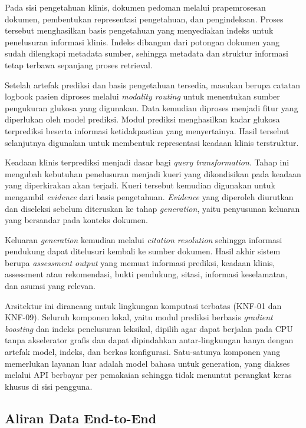\newpage
Pada sisi pengetahuan klinis, dokumen pedoman melalui prapemrosesan dokumen, pembentukan representasi pengetahuan, dan pengindeksan. Proses tersebut menghasilkan basis pengetahuan yang
menyediakan indeks untuk penelusuran informasi klinis. Indeks dibangun dari potongan dokumen yang sudah dilengkapi metadata sumber, sehingga metadata dan struktur informasi tetap terbawa sepanjang proses retrieval.

Setelah artefak prediksi dan basis pengetahuan tersedia, masukan berupa catatan logbook pasien diproses melalui \textit{modality routing} untuk menentukan sumber pengukuran
glukosa yang digunakan. Data kemudian diproses menjadi fitur yang diperlukan oleh model prediksi. Modul prediksi menghasilkan kadar glukosa terprediksi beserta informasi ketidakpastian
yang menyertainya. Hasil tersebut selanjutnya digunakan untuk membentuk representasi keadaan klinis terstruktur.

Keadaan klinis terprediksi menjadi dasar bagi \textit{query transformation}. Tahap ini mengubah kebutuhan penelusuran menjadi kueri yang dikondisikan pada keadaan yang diperkirakan akan
terjadi. Kueri tersebut kemudian digunakan untuk mengambil \textit{evidence} dari basis pengetahuan. \textit{Evidence} yang diperoleh diurutkan dan diseleksi sebelum diteruskan ke
tahap \textit{generation}, yaitu penyusunan keluaran yang bersandar pada konteks dokumen.

Keluaran \textit{generation} kemudian melalui \textit{citation resolution} sehingga informasi pendukung dapat ditelusuri kembali ke sumber dokumen. Hasil akhir sistem berupa \textit{assessment output} yang
memuat informasi prediksi, keadaan klinis, assessment atau rekomendasi, bukti pendukung, sitasi, informasi keselamatan, dan asumsi yang relevan.

Arsitektur ini dirancang untuk lingkungan komputasi terbatas (KNF-01 dan KNF-09). Seluruh komponen lokal, yaitu modul prediksi berbasis \textit{gradient boosting}
dan indeks penelusuran leksikal, dipilih agar dapat berjalan pada CPU tanpa akselerator grafis dan dapat dipindahkan antar-lingkungan hanya dengan artefak model,
indeks, dan berkas konfigurasi. Satu-satunya komponen yang memerlukan layanan luar adalah model bahasa untuk generation, yang diakses melalui API berbayar per
pemakaian sehingga tidak menuntut perangkat keras khusus di sisi pengguna.

\subsection{Aliran Data End-to-End}
\label{subsec:bab4-aliran-data-end-to-end}


